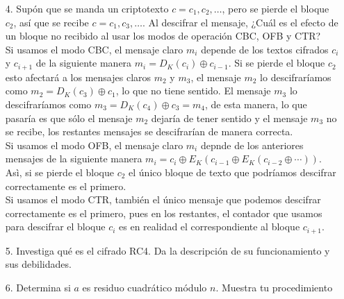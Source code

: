 \documentclass[12pt]{article}
\begin{document}
\begin{enumerate}
    \item[4.] Supón que se manda un criptotexto $c=c_1,c_2, \ldots$, pero se pierde el bloque $c_2$, así que 
      se recibe $c=c_1, c_3, \ldots$. Al descifrar el mensaje, ¿Cuál es el efecto de un bloque no recibido al usar los modos 
      de operación CBC, OFB y CTR?\\
      Si usamos el modo CBC, el mensaje claro $m_i$ depende de los textos cifrados $c_i$ y $c_{i+1}$ de la siguiente manera 
      $m_i = D_K(c_{i})\oplus c_{i-1}$. Si se pierde el bloque $c_2$ esto afectará a los mensajes claros $m_2$ y $m_3$, el mensaje $m_2$ 
      lo descifraríamos como $m_2 = D_K(c_{3})\oplus c_{1}$, lo que no tiene sentido. El mensaje $m_3$ lo descifraríamos como $m_3 = D_K(c_{4})\oplus c_3 = m_4$, 
      de esta manera, lo que pasaría es que sólo el mensaje $m_2$ dejaría de tener sentido y el mensaje $m_3$ no se recibe, los restantes mensajes se descifrarían de manera correcta.\\
      Si usamos el modo OFB, el mensaje claro $m_i$ depnde de los anteriores mensajes de la siguiente manera 
      $m_i = c_i \oplus E_K(c_{i-1}\oplus E_K(c_{i-2}\oplus \cdots))$. Asì, si se pierde el bloque $c_2$ el único bloque de texto que podríamos descifrar correctamente es el primero.\\
      Si usamos el modo CTR, también el único mensaje que podemos descifrar correctamente es el primero, pues en los restantes, el contador que usamos para descifrar el 
      bloque $c_i$ es en realidad el correspondiente al bloque $c_{i+1}$.
    \item[5.] Investiga qué es el cifrado RC4. Da la descripción de su funcionamiento y sus debilidades.

    \item[6.] Determina si $a$ es residuo cuadrático módulo $n$. Muestra tu procedimiento
  \end{enumerate}
\end{document}
